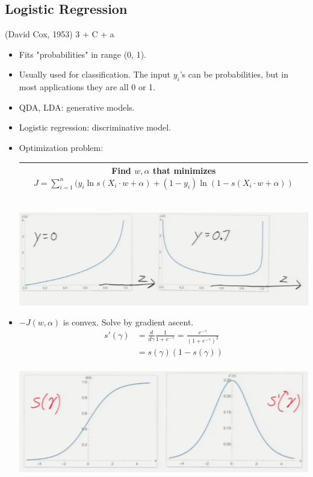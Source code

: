 \documentclass[10pt]{article}
\begin{document}
	\subsection*{Logistic Regression} (David Cox, 1953) 3 + C + a
		\begin{itemize}
			\item Fits "probabilities" in range (0, 1).
			\item Usually used for classification. The input $y_{i}$'s can be probabilities, but in most applications they are all 0 or 1.
			\item QDA, LDA: generative models.
			\item Logistic regression: discriminative model.
			\item Optimization problem:
				\begin{center}
					\begin{tabular}{|c|}
					\hline
						Find $w, \alpha$ that minimizes $J = \sum_{i=1}^{n}(y_{i} \ln s(X_{i} \cdot w + \alpha) + (1-y_{i}) \ln (1 - s(X_{i} \cdot w + \alpha))$\\
						\hline
					\end{tabular}\\
					[1em]
					\includegraphics[scale=0.5]{../images/logistics}
				\end{center}
			\item $-J(w, \alpha)$ is convex. Solve by gradient ascent.
			\begin{align*}
				s'(\gamma) &= \frac{d}{d\gamma} \frac{1}{1 + e^{-\gamma}} = \frac{e^{-\gamma}}{(1 + e^{-\gamma})^{2}}\\
				&= s(\gamma)(1 - s(\gamma))\\
			\end{align*}
			\begin{center}
				\includegraphics[scale=0.5]{../images/gradients}

\end{center}
\end{itemize}
\end{document}
